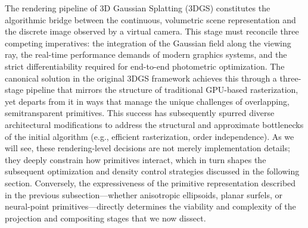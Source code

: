 \documentclass[11pt,a4paper]{article}
\begin{document}
The rendering pipeline of 3D Gaussian Splatting (3DGS) constitutes the algorithmic bridge between the continuous, volumetric scene representation and the discrete image observed by a virtual camera. This stage must reconcile three competing imperatives: the integration of the Gaussian field along the viewing ray, the real-time performance demands of modern graphics systems, and the strict differentiability required for end-to-end photometric optimization. The canonical solution in the original 3DGS framework achieves this through a three-stage pipeline that mirrors the structure of traditional GPU-based rasterization, yet departs from it in ways that manage the unique challenges of overlapping, semitransparent primitives. This success has subsequently spurred diverse architectural modifications to address the structural and approximate bottlenecks of the initial algorithm (e.g., efficient rasterization, order independence). As we will see, these rendering-level decisions are not merely implementation details; they deeply constrain how primitives interact, which in turn shapes the subsequent optimization and density control strategies discussed in the following section. Conversely, the expressiveness of the primitive representation described in the previous subsection---whether anisotropic ellipsoids, planar surfels, or neural-point primitives---directly determines the viability and complexity of the projection and compositing stages that we now dissect.
\end{document}
